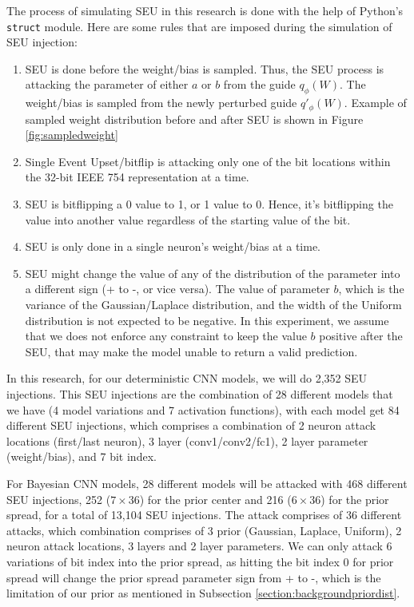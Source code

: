 \documentclass[ %
                    author={Revalda Putawara},
                supervisor={Dr. James Pope},
                    degree={MSc},
                     title={Robustness of Bayesian Neural Networks Design Choices Against Weight and Bias Perturbation Induced by Single Event Upsets (SEUs)},
                      type={},
                      year={2025}]{dissertation}
\begin{document}
The process of simulating SEU in this research is done with the help of Python's \texttt{struct} module. Here are some rules that are imposed during the simulation of SEU injection:
\begin{enumerate}
\item SEU is done before the weight/bias is sampled. Thus, the SEU process is attacking the parameter of either $a$ or $b$ from the guide $q_\phi(W)$.  The weight/bias is sampled from the newly perturbed guide $q'_\phi(W)$. Example of sampled weight distribution before and after SEU is shown in Figure \ref{fig:sampledweight}
\item Single Event Upset/bitflip is attacking only one of the bit locations within the 32-bit IEEE 754 representation at a time. 
\item SEU is bitflipping a 0 value to 1, or 1 value to 0. Hence, it's bitflipping the value into another value regardless of the starting value of the bit.
\item SEU is only done in a single neuron's weight/bias at a time.
\item SEU might change the value of any of the distribution of the parameter into a different sign (+ to -, or vice versa). The value of parameter $b$, which is the variance of the Gaussian/Laplace distribution, and the width of the Uniform distribution is not expected to be negative. In this experiment, we assume that we does not enforce any constraint to keep the value $b$ positive after the SEU, that may make the model unable to return a valid prediction.
\end{enumerate}

In this research, for our deterministic CNN models, we will do 2,352 SEU injections. This SEU injections are the combination of 28 different models that we have (4 model variations and 7 activation functions), with each model get 84 different SEU injections, which comprises a combination of 2 neuron attack locations (first/last neuron), 3 layer (conv1/conv2/fc1), 2 layer parameter (weight/bias), and 7 bit index. 

For Bayesian CNN models, 28 different models will be attacked with 468 different SEU injections, 252 ($7 \times 36$) for the prior center and 216 ($6 \times 36$) for the prior spread, for a total of 13,104 SEU injections. The attack comprises of 36 different attacks, which combination comprises of 3 prior (Gaussian, Laplace, Uniform), 2 neuron attack locations, 3 layers and 2 layer parameters. We can only attack 6 variations of bit index into the prior spread, as hitting the bit index 0 for prior spread will change the prior spread parameter sign from + to -, which is the limitation of our prior as mentioned in Subsection \ref{section:backgroundpriordist}.
\end{document}
